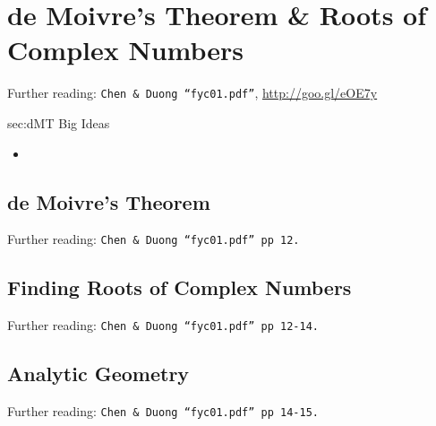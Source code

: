 \chapter{de Moivre's Theorem \& Roots of Complex Numbers}
\label{chap:dMT}
Further reading: \texttt{Chen \& Duong ``fyc01.pdf''}, \url{http://goo.gl/eOE7y}

\begin{bigideas}{sec:dMT Big Ideas}
\begin{itemize}
  \item 
\end{itemize}
\end{bigideas}

\section{de Moivre's Theorem}
\label{sec:dMT dMT}
Further reading: \texttt{Chen \& Duong ``fyc01.pdf'' pp 12.}

\section{Finding Roots of Complex Numbers}
\label{sec:dMT Finding Roots of Complex Numbers}
Further reading: \texttt{Chen \& Duong ``fyc01.pdf'' pp 12-14.}

\section{Analytic Geometry}
\label{sec:dMT Analytic Geometry}
Further reading: \texttt{Chen \& Duong ``fyc01.pdf'' pp 14-15.}
